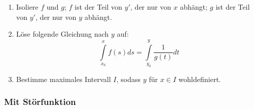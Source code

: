 \documentclass[a4paper, 16pt]{article}
\begin{document}
	\begin{enumerate}
		\item Isoliere $f$ und $g$; $f$ ist der Teil von $y'$, der nur von $x$ abhängt; $g$ ist der Teil von $y'$, der nur von $y$ abhängt.
		\item Löse folgende Gleichung nach $y$ auf:
			\begin{equation*}
				\int\limits_{x_0}^{x}{f(s)}ds = \int\limits_{y_0}^{y}{\frac{1}{g(t)}}dt
			\end{equation*}
		\item Bestimme maximales Intervall $I$, sodass $y$ für $x \in I$ wohldefiniert.
	\end{enumerate}

	\subsubsection{Mit Störfunktion}
\end{document}
